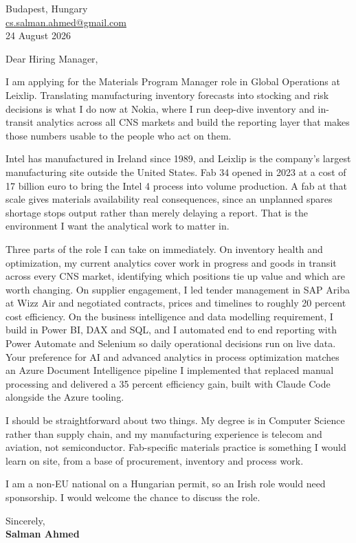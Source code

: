 \documentclass[11pt,a4paper]{article}
\begin{document}
Budapest, Hungary\\
\href{mailto:cs.salman.ahmed@gmail.com}{cs.salman.ahmed@gmail.com}\\
24 August 2026

\vspace{6pt}

Dear Hiring Manager,

I am applying for the Materials Program Manager role in Global Operations at Leixlip. Translating manufacturing inventory forecasts into stocking and risk decisions is what I do now at Nokia, where I run deep-dive inventory and in-transit analytics across all CNS markets and build the reporting layer that makes those numbers usable to the people who act on them.

Intel has manufactured in Ireland since 1989, and Leixlip is the company's largest manufacturing site outside the United States. Fab 34 opened in 2023 at a cost of 17 billion euro to bring the Intel 4 process into volume production. A fab at that scale gives materials availability real consequences, since an unplanned spares shortage stops output rather than merely delaying a report. That is the environment I want the analytical work to matter in.

Three parts of the role I can take on immediately. On inventory health and optimization, my current analytics cover work in progress and goods in transit across every CNS market, identifying which positions tie up value and which are worth changing. On supplier engagement, I led tender management in SAP Ariba at Wizz Air and negotiated contracts, prices and timelines to roughly 20 percent cost efficiency. On the business intelligence and data modelling requirement, I build in Power BI, DAX and SQL, and I automated end to end reporting with Power Automate and Selenium so daily operational decisions run on live data. Your preference for AI and advanced analytics in process optimization matches an Azure Document Intelligence pipeline I implemented that replaced manual processing and delivered a 35 percent efficiency gain, built with Claude Code alongside the Azure tooling.

I should be straightforward about two things. My degree is in Computer Science rather than supply chain, and my manufacturing experience is telecom and aviation, not semiconductor. Fab-specific materials practice is something I would learn on site, from a base of procurement, inventory and process work.

I am a non-EU national on a Hungarian permit, so an Irish role would need sponsorship. I would welcome the chance to discuss the role.

\vspace{4pt}

Sincerely,\\[2pt]
{\color{accent}\textbf{Salman Ahmed}}
\end{document}

